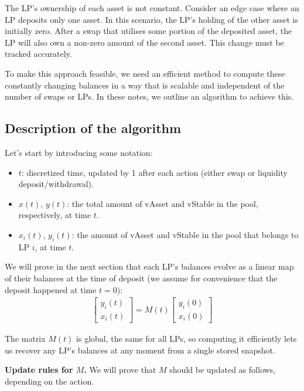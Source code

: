 \documentclass{article}
\begin{document}
The LP's ownership of each asset is not constant. Consider an edge case where an LP
deposits only one asset. In this scenario, the LP's holding of the other asset is initially
zero. After a swap that utilises some portion of the deposited asset, the LP will also own a
non-zero amount of the second asset. This change must be tracked accurately.

To make this approach feasible, we need an efficient method to compute these constantly
changing balances in a way that is scalable and independent of the number of swaps or LPs.
In these notes, we outline an algorithm to achieve this.

\subsection{Description of the algorithm}
Let's start by introducing some notation:

\begin{itemize}
\item $t$: discretized time, updated by 1 after each action (either swap or liquidity
      deposit/withdrawal).

\item $x(t),\, y(t)$: the total amount of vAsset and vStable in the pool, respectively, at
      time $t$.

\item $x_i(t),\, y_i(t)$: the amount of vAsset and vStable in the pool that belongs to LP
      $i$, at time $t$.
\end{itemize}

We will prove in the next section that each LP's balances evolve as a linear map of their
balances at the time of deposit (we assume for convenience that the deposit happened at
time $t = 0$):
\begin{align}\label{balance formula}
\begin{bmatrix} y_i(t) \\ x_i(t) \end{bmatrix}
= M(t) \begin{bmatrix} y_i(0) \\ x_i(0) \end{bmatrix}
\end{align}

The matrix $M(t)$ is global, the same for all LPs, so computing it efficiently lets us
recover any LP's balances at any moment from a single stored snapshot.

\medskip
\noindent\textbf{Update rules for $M$.}
We will prove that $M$ should be updated as follows, depending on the action.
\end{document}
